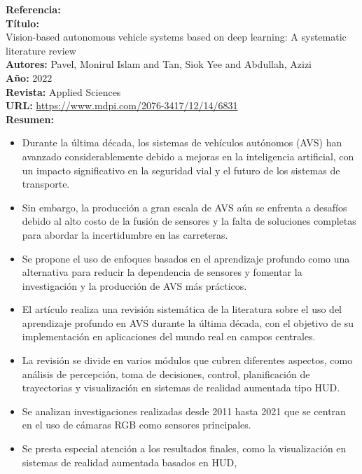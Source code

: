 \documentclass[10pt,letterpaper,final]{article}
\begin{document}
\begin{longtable}
        \hline
        \noindent \textbf{Referencia:}~\cite{pavel2022vision} \\
        \textbf{Título:} \\
        Vision-based autonomous vehicle systems based on deep learning: A systematic literature review \\
        \textbf{Autores:}
        Pavel, Monirul Islam and Tan, Siok Yee and Abdullah, Azizi \\
        \textbf{Año:}
        2022 \\
        \textbf{Revista:}
        Applied Sciences \\
        \textbf{URL:}
        \url{https://www.mdpi.com/2076-3417/12/14/6831} \\
        \textbf{Resumen:} \\
        \begin{itemize}
            \item Durante la última década, los sistemas de vehículos autónomos (AVS) han avanzado considerablemente debido a mejoras
            en la inteligencia artificial, con un impacto significativo en la seguridad vial y el futuro de los sistemas de transporte.
            \item Sin embargo, la producción a gran escala de AVS aún se enfrenta a desafíos debido al alto costo de la fusión
            de sensores y la falta de soluciones completas para abordar la incertidumbre en las carreteras.
            \item Se propone el uso de enfoques basados en el aprendizaje profundo como una alternativa para reducir la dependencia
            de sensores y fomentar la investigación y la producción de AVS más prácticos.
            \item El artículo realiza una revisión sistemática de la literatura sobre el uso del aprendizaje profundo en AVS
            durante la última década, con el objetivo de su implementación en aplicaciones del mundo real en campos centrales.
            \item La revisión se divide en varios módulos que cubren diferentes aspectos, como análisis de percepción, toma de decisiones,
            control, planificación de trayectorias y visualización en sistemas de realidad aumentada tipo HUD.
            \item Se analizan investigaciones realizadas desde 2011 hasta 2021 que se centran en el uso de cámaras RGB como sensores principales.
            \item Se presta especial atención a los resultados finales, como la visualización en sistemas de realidad aumentada basados en HUD,

\end{itemize}
\end{longtable}
\end{document}
